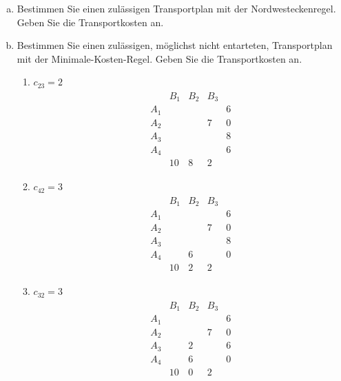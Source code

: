 \documentclass[
a4paper, %
11pt,
]
{scrartcl}
\begin{document}
\begin{enumerate}[(a)]
  \item Bestimmen Sie einen zulässigen Transportplan mit der Nordwesteckenregel.
    Geben Sie die Transportkosten an.

  \item Bestimmen Sie einen zulässigen, möglichst nicht entarteten,
    Transportplan mit der Minimale-Kosten-Regel.
    Geben Sie die Transportkosten an.

    \begin{enumerate}[1.]
      \item $c_{23} = 2$
        \begin{align*}
          \begin{matrix}
                & B_1 & B_2 & B_3 & \\
            A_1 &     &     &     & 6\\
            A_2 &     &     & 7   & 0\\
            A_3 &     &     &     & 8\\
            A_4 &     &     &     & 6\\
                & 10  & 8   & 2
          \end{matrix}
        \end{align*}

      \item $c_{42} = 3$
        \begin{align*}
          \begin{matrix}
                & B_1 & B_2 & B_3 & \\
            A_1 &     &     &     & 6\\
            A_2 &     &     & 7   & 0\\
            A_3 &     &     &     & 8\\
            A_4 &     & 6   &     & 0\\
                & 10  & 2   & 2
          \end{matrix}
        \end{align*}

      \item $c_{32} = 3$
        \begin{align*}
          \begin{matrix}
                & B_1 & B_2 & B_3 & \\
            A_1 &     &     &     & 6\\
            A_2 &     &     & 7   & 0\\
            A_3 &     & 2   &     & 6\\
            A_4 &     & 6   &     & 0\\
                & 10  & 0   & 2
          \end{matrix}
        \end{align*}


\end{enumerate}
\end{enumerate}
\end{document}
